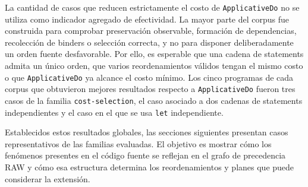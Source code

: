 La cantidad de casos que reducen estrictamente el costo de \texttt{ApplicativeDo} no se utiliza como indicador agregado de efectividad. La mayor parte del corpus fue construida para comprobar preservación observable, formación de dependencias, recolección de binders o selección correcta, y no para disponer deliberadamente un orden fuente desfavorable. Por ello, es esperable que una cadena de statements admita un único orden, que varios reordenamientos válidos tengan el mismo costo o que \texttt{ApplicativeDo} ya alcance el costo mínimo. Los cinco programas de cada corpus que obtuvieron mejores resultados respecto a \texttt{ApplicativeDo} fueron tres casos de la familia \texttt{cost-selection}, el caso asociado a dos cadenas de statements independientes y el caso en el que se usa \texttt{let} independiente.

Establecidos estos resultados globales, las secciones siguientes presentan casos representativos de las familias evaluadas. El objetivo es mostrar cómo los fenómenos presentes en el código fuente se reflejan en el grafo de precedencia RAW y cómo esa estructura determina los reordenamientos y planes que puede considerar la extensión.
